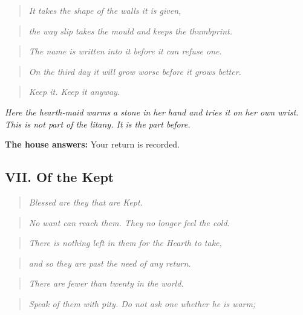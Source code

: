 \documentclass{design/chronicle}
\begin{document}
\begin{quote}\itshape It takes the shape of the walls it is given,\end{quote}

\begin{quote}\itshape the way slip takes the mould and keeps the thumbprint.\end{quote}

\begin{quote}\itshape The name is written into it before it can refuse one.\end{quote}

\begin{quote}\itshape On the third day it will grow worse before it grows better.\end{quote}

\begin{quote}\itshape Keep it. Keep it anyway.\end{quote}

\emph{Here the hearth-maid warms a stone in her hand and tries it on her own wrist. This is not part of the litany. It is the part before.}

\textbf{The house answers:} Your return is recorded.

\subsection*{VII. Of the Kept}

\begin{quote}\itshape Blessed are they that are Kept.\end{quote}

\begin{quote}\itshape No want can reach them. They no longer feel the cold.\end{quote}

\begin{quote}\itshape There is nothing left in them for the Hearth to take,\end{quote}

\begin{quote}\itshape and so they are past the need of any return.\end{quote}

\begin{quote}\itshape There are fewer than twenty in the world.\end{quote}

\begin{quote}\itshape Speak of them with pity. Do not ask one whether he is warm;\end{quote}
\end{document}
